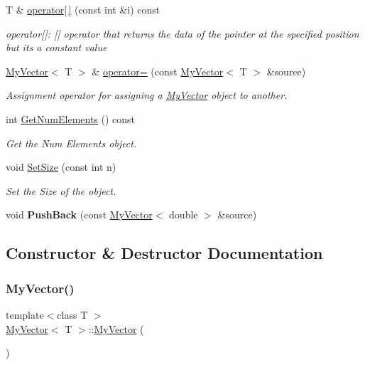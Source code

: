 \begin{DoxyCompactItemize}
T \& \mbox{\hyperlink{class_my_vector_a01d48c27ba17ad15aa29b2f039c303cd}{operator\mbox{[}$\,$\mbox{]}}} (const int \&i) const
\begin{DoxyCompactList}\small\item\em operator\mbox{[}\mbox{]}\+: \mbox{[}\mbox{]} operator that returns the data of the pointer at the specified position but it\textquotesingle{}s a constant value \end{DoxyCompactList}\item 
\mbox{\hyperlink{class_my_vector}{My\+Vector}}$<$ T $>$ \& \mbox{\hyperlink{class_my_vector_a459ecae4c3fc3836415467db79bd0af2}{operator=}} (const \mbox{\hyperlink{class_my_vector}{My\+Vector}}$<$ T $>$ \&source)
\begin{DoxyCompactList}\small\item\em Assignment operator for assigning a \mbox{\hyperlink{class_my_vector}{My\+Vector}} object to another. \end{DoxyCompactList}\item 
int \mbox{\hyperlink{class_my_vector_a5806423f48877c084cc436ecdffa756c}{Get\+Num\+Elements}} () const
\begin{DoxyCompactList}\small\item\em Get the Num Elements object. \end{DoxyCompactList}\item 
void \mbox{\hyperlink{class_my_vector_a54da580455b3348ddc47a6359e9db444}{Set\+Size}} (const int n)
\begin{DoxyCompactList}\small\item\em Set the Size of the object. \end{DoxyCompactList}\item 
\mbox{\label{class_my_vector_a1070a35184f1a8223a7df7f4fdd78492}} 
void {\bfseries Push\+Back} (const \mbox{\hyperlink{class_my_vector}{My\+Vector}}$<$ double $>$ \&source)
\end{DoxyCompactItemize}


\subsection{Constructor \& Destructor Documentation}
\mbox{\label{class_my_vector_ac356762c5ced52c0d934476cef32e472}} 
\subsubsection{\texorpdfstring{MyVector()}{MyVector()}\hspace{0.1cm}{\footnotesize\ttfamily [1/3]}}
{\footnotesize\ttfamily template$<$class T $>$ \\
\mbox{\hyperlink{class_my_vector}{My\+Vector}}$<$ T $>$\+::\mbox{\hyperlink{class_my_vector}{My\+Vector}} (\begin{DoxyParamCaption}{ }\end{DoxyParamCaption})}



